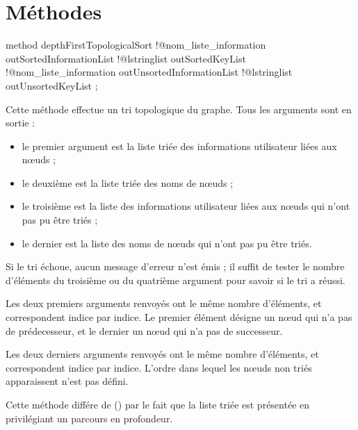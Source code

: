 \section{Méthodes}


\begin{galgascode}
method depthFirstTopologicalSort
  !@nom_liste_information outSortedInformationList
  !@lstringlist outSortedKeyList
  !@nom_liste_information outUnsortedInformationList
  !@lstringlist outUnsortedKeyList
;
\end{galgascode}

Cette méthode effectue un tri topologique du graphe. Tous les arguments sont en sortie :
\begin{itemize}
  \item le premier argument  est la liste triée des informations utilisateur liées aux nœuds ;
  \item le deuxième  est la liste triée des noms de nœuds ;
  \item le troisième  est la liste des informations utilisateur liées aux nœuds qui n'ont pas pu être triés ;
  \item le dernier  est la liste des noms de nœuds qui n'ont pas pu être triés.
\end{itemize}

Si le tri échoue, aucun message d'erreur n'est émis ; il suffit de tester le nombre d'éléments du troisième ou du quatrième argument pour savoir si le tri a réussi.

Les deux premiers arguments renvoyés ont le même nombre d'éléments, et correspondent indice par indice. Le premier élément désigne un nœud qui n'a pas de prédecesseur, et le dernier un nœud qui n'a pas de successeur.


Les deux derniers arguments renvoyés ont le même nombre d'éléments, et correspondent indice par indice. L'ordre dans lequel les nœuds non triés apparaissent n'est pas défini.

Cette méthode différe de  () par le fait que la liste triée est présentée en privilégiant un parcours en profondeur.







